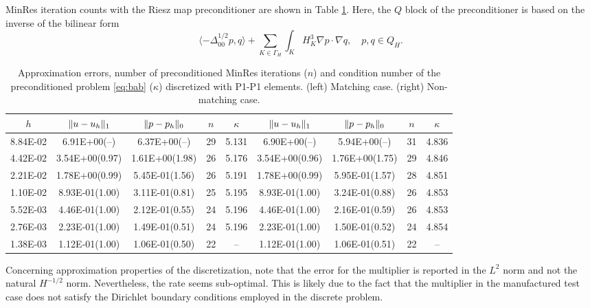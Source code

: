 \documentclass[r]{siamart171218}
\begin{document}
MinRes iteration counts with the Riesz map preconditioner are shown in
Table \ref{tab:p1_p1}. Here, the $Q$ block of the preconditioner is based
on the inverse of the bilinear form
\[
\langle -\Delta_{00}^{1/2} p, q\rangle + \sum_{K\in\Gamma_H}\int_{K} H_K^3\nabla p \cdot\nabla q,\quad p, q\in Q_H.
\]
%

\begin{table}
  \begin{center}
    \footnotesize{
  \begin{tabular}{c|cc|c|c||cc|c|c}
    \hline
    $h$ & $\lVert{u-u_h}\rVert_1$ & $\lVert{p-p_h}\rVert_0$ & $n$ & $\kappa$
        & $\lVert{u-u_h}\rVert_1$ & $\lVert{p-p_h}\rVert_0$ & $n$ & $\kappa$ \\
    \hline
8.84E-02 & 6.91E+00(--)   & 6.37E+00(--)   & 29 & 5.131 & 6.90E+00(--)  & 5.94E+00(--)    & 31 & 4.836\\
4.42E-02 & 3.54E+00(0.97) & 1.61E+00(1.98) & 26 & 5.176 & 3.54E+00(0.96) & 1.76E+00(1.75) & 29 & 4.846\\
2.21E-02 & 1.78E+00(0.99) & 5.45E-01(1.56) & 26 & 5.191 & 1.78E+00(0.99) & 5.95E-01(1.57) & 28 & 4.851\\
1.10E-02 & 8.93E-01(1.00) & 3.11E-01(0.81) & 25 & 5.195 & 8.93E-01(1.00) & 3.24E-01(0.88) & 26 & 4.853\\
5.52E-03 & 4.46E-01(1.00) & 2.12E-01(0.55) & 24 & 5.196 & 4.46E-01(1.00) & 2.16E-01(0.59) & 26 & 4.853\\
2.76E-03 & 2.23E-01(1.00) & 1.49E-01(0.51) & 24 & 5.196 & 2.23E-01(1.00) & 1.50E-01(0.52) & 24 & 4.854\\
1.38E-03 & 1.12E-01(1.00) & 1.06E-01(0.50) & 22 & --    & 1.12E-01(1.00) & 1.06E-01(0.51) & 22 & --   \\
    \hline
  \end{tabular}
  }
    \caption{Approximation errors, number of preconditioned MinRes iterations ($n$) and
      condition number of the preconditioned problem \eqref{eq:bab} ($\kappa$) discretized
      with P1-P1 elements. (left) Matching case. (right) Non-matching case.}
  \label{tab:p1_p1}
  \end{center}
\end{table}
%
Concerning approximation properties of the discretization, note that the error
for the multiplier is reported in the $L^2$ norm and not the natural $H^{-1/2}$
norm. Nevertheless, the rate seems sub-optimal. This is likely due to the fact
that the multiplier in the manufactured test case does not satisfy the
Dirichlet boundary conditions employed in the discrete problem.
\end{document}
